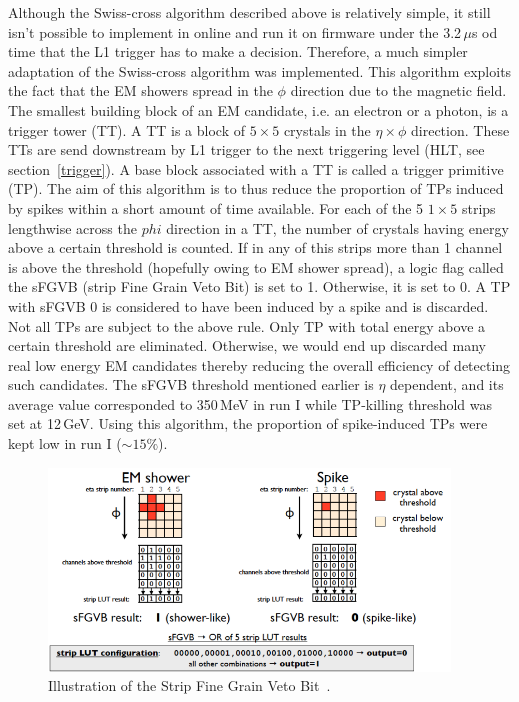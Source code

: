 Although the Swiss-cross algorithm described above is relatively simple, it still isn't possible to implement in online and run it on firmware under the 3.2\,$\mu$s od time that the L1 trigger has to make a decision. Therefore, a much simpler adaptation of the Swiss-cross algorithm was implemented. This algorithm exploits the fact that the EM showers spread in the $\phi$ direction due to the magnetic field. The smallest building block of an EM candidate, i.e. an electron or a photon, is a trigger tower (TT). A TT is a block of $5\times5$ crystals in the $\eta\times\phi$ direction. These TTs are send downstream by L1 trigger to the next triggering level (HLT, see section~\ref{trigger}). A base block associated with a TT is called a trigger primitive (TP). The aim of this algorithm is to thus reduce the proportion of TPs induced by spikes within a short amount of time available. For each of the 5 $1\times5$ strips lengthwise across the $phi$ direction in a TT, the number of crystals  having energy above a certain threshold is counted. If in any of this strips more than 1 channel is above the threshold (hopefully owing to EM shower spread), a logic flag called the sFGVB (strip Fine Grain Veto Bit) is set to 1. Otherwise, it is set to 0. A TP with sFGVB 0 is considered to have been induced by a spike and is discarded. Not all TPs are subject to the above rule. Only TP with total energy above a certain threshold are eliminated. Otherwise, we would end up discarded many real low energy EM candidates thereby reducing the overall efficiency of detecting such candidates. The sFGVB threshold mentioned earlier is $\eta$ dependent, and its average value corresponded to 350\,MeV in run I while TP-killing threshold was set at 12\,GeV. Using this algorithm, the proportion of spike-induced TPs were kept low in run I ($\sim15\%$).      


\begin{figure}
\begin{center}
  \includegraphics[width=0.95\textwidth,keepaspectratio]{plots_and_figures/chapter3/sfgvb.png}
\caption{Illustration of the Strip Fine Grain Veto Bit~\cite{sfgvb}.}
\label{fig:swisscross}
\end{center}
\end{figure}

